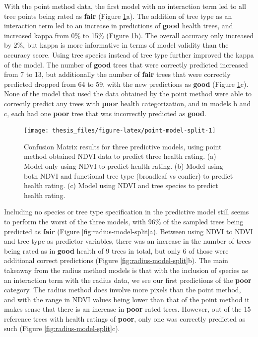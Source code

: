 \documentclass[12pt,twoside]{reedthesis}
\begin{document}
With the point method data, the first model with no interaction term led to all tree points being rated as \textbf{fair} (Figure \ref{fig:point-model-split}a). The addition of tree type as an interaction term led to an increase in predictions of \textbf{good} health trees, and increased kappa from 0\% to 15\% (Figure \ref{fig:point-model-split}b). The overall accuracy only increased by 2\%, but kappa is more informative in terms of model validity than the accuracy score. Using tree species instead of tree type further improved the kappa of the model. The number of \textbf{good} trees that were correctly predicted increased from 7 to 13, but additionally the number of \textbf{fair} trees that were correctly predicted dropped from 64 to 59, with the new predictions as \textbf{good} (Figure \ref{fig:point-model-split}c). None of the model that used the data obtained by the point method were able to correctly predict any trees with \textbf{poor} health categorization, and in models b and c, each had one \textbf{poor} tree that was incorrectly predicted as \textbf{good}.
\begin{figure}

{\centering \texttt{[image: thesis\_files/figure-latex/point-model-split-1]} 

}

\caption[Confusion matrixes for Point method predictive models]{Confusion Matrix results for three predictive models, using point method obtained NDVI data to predict three health rating. (a) Model only using NDVI to predict health rating. (b) Model using both NDVI and functional tree type (broadleaf vs confier) to predict health rating. (c) Model using NDVI and tree species to predict health rating.}\label{fig:point-model-split}
\end{figure}
Including no species or tree type specification in the predictive model still seems to perform the worst of the three models, with 96\% of the sampled trees being predicted as \textbf{fair} (Figure \ref{fig:radius-model-split}a). Between using NDVI to NDVI and tree type as predictor variables, there was an increase in the number of trees being rated as in \textbf{good} health of 9 trees in total, but only 6 of those were additional correct predictions (Figure \ref{fig:radius-model-split}b). The main takeaway from the radius method models is that with the inclusion of species as an interaction term with the radius data, we see our first predictions of the \textbf{poor} category. The radius method does involve more pixels than the point method, and with the range in NDVI values being lower than that of the point method it makes sense that there is an increase in \textbf{poor} rated trees. However, out of the 15 reference trees with health ratings of \textbf{poor}, only one was correctly predicted as such (Figure \ref{fig:radius-model-split}c).
\end{document}
